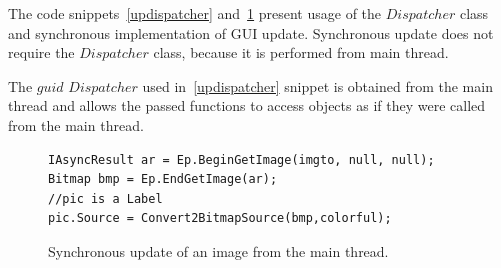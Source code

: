   The code snippets~\ref{updispatcher} and~\ref{upsynchronous} present usage of the $Dispatcher$ class and 
  synchronous implementation of GUI update. Synchronous update does not require the $Dispatcher$ class,
  because it is performed from main thread.

  The $guid$ $Dispatcher$ used in~\ref{updispatcher} snippet is obtained from the main thread and
  allows the passed functions to access objects as if they were called from the main thread.

\begin{figure}[!hbp]
\begin{lstlisting}
IAsyncResult ar = Ep.BeginGetImage(imgto, null, null);
Bitmap bmp = Ep.EndGetImage(ar);
//pic is a Label
pic.Source = Convert2BitmapSource(bmp,colorful);
\end{lstlisting}
\caption{Synchronous update of an image from the main thread.}
\label{upsynchronous}
\end{figure}
